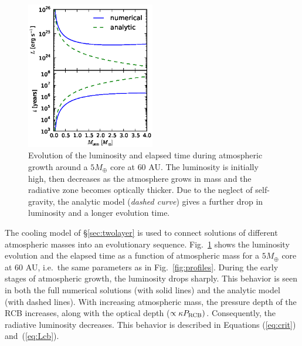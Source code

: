 \documentclass[apj, numberedappendix]{emulateapj}
\newcommand{\Eqs}[2]{Equations (\ref{#1}) and~(\ref{#2})}
\newcommand{\Fig}[1]{Fig.~\ref{#1}}
\newcommand{\cb}{_{\rm RCB}}
\begin{document}
\begin{figure}[tb]
\centering
\includegraphics[width=0.5\textwidth]{../../figs/ModelAtmospheres/RadSelfGravPoly/PaperFigs/Lt_profiles_v2.eps}
\caption{Evolution of the luminosity and elapsed time during atmospheric growth around a $5 M_{\oplus}$ core at $60$ AU.  The luminosity is initially high, then decreases as the atmosphere grows in mass and the radiative zone becomes optically thicker.  Due to the neglect of self-gravity, the analytic model (\emph{dashed curve}) gives a further drop in luminosity and a longer evolution time.}
\label{fig:Ltplot}
\end{figure}

The cooling model of \S\ref{sec:twolayer} is used to connect solutions of different atmospheric masses into an evolutionary sequence.  \Fig{fig:Ltplot} shows the luminosity evolution and the elapsed time as a function of atmospheric mass for a $5 M_{\oplus}$ core at $60$ AU, i.e.\ the same parameters as in \Fig{fig:profiles}.  During the early stages of atmospheric growth, the luminosity drops sharply.  This behavior is seen in both the full numerical solutions (with solid lines) and the analytic model (with dashed lines).  With increasing atmospheric mass, the pressure depth of the RCB increases, along with the optical depth ($\propto \kappa P\cb)$.  Consequently, the radiative luminosity decreases.  This behavior is described in \Eqs{eq:crit}{eq:Lcb}.
\end{document}
